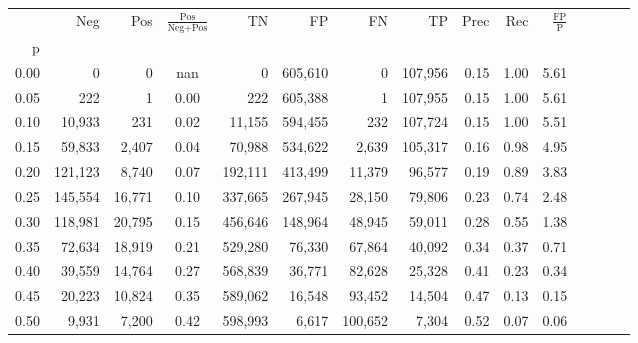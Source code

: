 \begin{tabular}{rrrcrrrrrrrrrrr}
\toprule
{} &      Neg &     Pos & $\frac{\text{Pos}}{\text{Neg}+\text{Pos}}$ &       TN &       FP &       FN &       TP &  Prec &   Rec & $\frac{\text{FP}}{\text{P}}$ \\
p    &          &         &                                            &          &          &          &          &       &       &                              \\
\midrule
0.00 &        0 &       0 &                                        nan &        0 &  605,610 &        0 &  107,956 &  0.15 &  1.00 &                         5.61 \\
0.05 &      222 &       1 &                                       0.00 &      222 &  605,388 &        1 &  107,955 &  0.15 &  1.00 &                         5.61 \\
0.10 &   10,933 &     231 &                                       0.02 &   11,155 &  594,455 &      232 &  107,724 &  0.15 &  1.00 &                         5.51 \\
0.15 &   59,833 &   2,407 &                                       0.04 &   70,988 &  534,622 &    2,639 &  105,317 &  0.16 &  0.98 &                         4.95 \\
0.20 &  121,123 &   8,740 &                                       0.07 &  192,111 &  413,499 &   11,379 &   96,577 &  0.19 &  0.89 &                         3.83 \\
0.25 &  145,554 &  16,771 &                                       0.10 &  337,665 &  267,945 &   28,150 &   79,806 &  0.23 &  0.74 &                         2.48 \\
0.30 &  118,981 &  20,795 &                                       0.15 &  456,646 &  148,964 &   48,945 &   59,011 &  0.28 &  0.55 &                         1.38 \\
0.35 &   72,634 &  18,919 &                                       0.21 &  529,280 &   76,330 &   67,864 &   40,092 &  0.34 &  0.37 &                         0.71 \\
0.40 &   39,559 &  14,764 &                                       0.27 &  568,839 &   36,771 &   82,628 &   25,328 &  0.41 &  0.23 &                         0.34 \\
0.45 &   20,223 &  10,824 &                                       0.35 &  589,062 &   16,548 &   93,452 &   14,504 &  0.47 &  0.13 &                         0.15 \\
0.50 &    9,931 &   7,200 &                                       0.42 &  598,993 &    6,617 &  100,652 &    7,304 &  0.52 &  0.07 &                         0.06 \\

\end{tabular}
